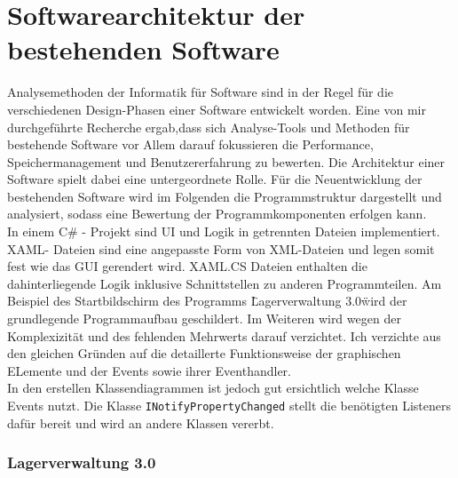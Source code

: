 

\chapter{Softwarearchitektur der bestehenden Software}

    Analysemethoden der Informatik für Software sind in der Regel für die verschiedenen Design-Phasen einer Software entwickelt worden.
    Eine von mir durchgeführte Recherche ergab,dass sich Analyse-Tools und Methoden für bestehende Software vor
    Allem darauf fokussieren die Performance, Speichermanagement und Benutzererfahrung zu bewerten.
    Die Architektur einer Software spielt dabei eine untergeordnete Rolle.
    Für die Neuentwicklung der bestehenden Software wird im Folgenden die Programmstruktur dargestellt und analysiert,
    sodass eine Bewertung der Programmkomponenten erfolgen kann.
    \\
    In einem C\# - Projekt sind UI und Logik in getrennten Dateien implementiert. XAML- Dateien sind eine angepasste
    Form von XML-Dateien und legen somit fest wie das GUI gerendert wird.
    XAML.CS Dateien enthalten die dahinterliegende Logik inklusive Schnittstellen zu anderen Programmteilen.
    Am Beispiel des Startbildschirm des Programms \"Lagerverwaltung 3.0\" wird der grundlegende Programmaufbau geschildert.
    Im Weiteren wird wegen der Komplexizität und des fehlenden Mehrwerts darauf verzichtet.
    Ich verzichte aus den gleichen Gründen auf die detaillerte Funktionsweise der graphischen ELemente und der Events
    sowie ihrer Eventhandler.
    \\
    In den erstellen Klassendiagrammen ist jedoch gut ersichtlich welche Klasse Events nutzt. Die Klasse
    \verb|INotifyPropertyChanged| stellt die benötigten Listeners dafür bereit und wird an andere Klassen vererbt.

    \subsection {Lagerverwaltung 3.0}

